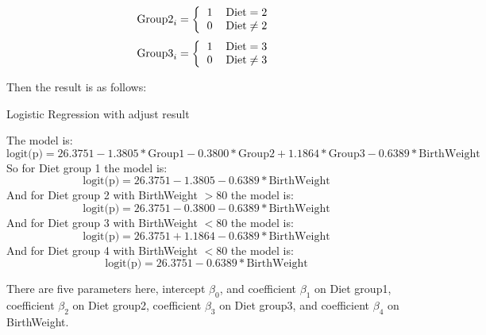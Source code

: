\documentclass[10pt,letterpaper]{article}
\begin{document}
\begin{enumerate}[leftmargin=0cm,itemindent=.5cm,labelwidth=\itemindent,labelsep=0cm,align=left]
\begin{multicols}{2}
\[\text{Group2}_i=  
\left \{
  \begin{tabular}{cc}
  1 &  $\text{Diet}= 2$\\
  0 &  $\text{Diet} \neq 2$\\
  \end{tabular}
\right.
\]
\[\text{Group3}_i=  
\left \{
  \begin{tabular}{cc}
  1 &  $\text{Diet}= 3$\\
  0 &  $\text{Diet} \neq 3$\\
  \end{tabular}
\right.
\]
\end{multicols}

Then the result is as follows:
\begin{center}
Logistic Regression with adjust result

\end{center}
The model is:
\[\text{logit(p)} = 26.3751-1.3805*\text{Group1}-0.3800*\text{Group2}+1.1864*\text{Group3}-0.6389*\text{BirthWeight}\]
So for Diet group 1 the model is:
\[\text{logit(p)} = 26.3751-1.3805-0.6389*\text{BirthWeight}\]
And for Diet group 2 with BirthWeight $>80$ the model is:
\[\text{logit(p)} = 26.3751-0.3800-0.6389*\text{BirthWeight}\]
And for Diet group 3 with BirthWeight $<80$ the model is:
\[\text{logit(p)} = 26.3751+1.1864-0.6389*\text{BirthWeight}\]
And for Diet group 4 with BirthWeight $<80$ the model is:
\[\text{logit(p)} = 26.3751-0.6389*\text{BirthWeight}\]

There are five parameters here, intercept $\beta_0$, and coefficient $\beta_1$ on Diet group1,  coefficient $\beta_2$ on Diet group2, coefficient $\beta_3$ on Diet group3, and coefficient $\beta_4$ on BirthWeight.


\end{enumerate}
\end{document}
